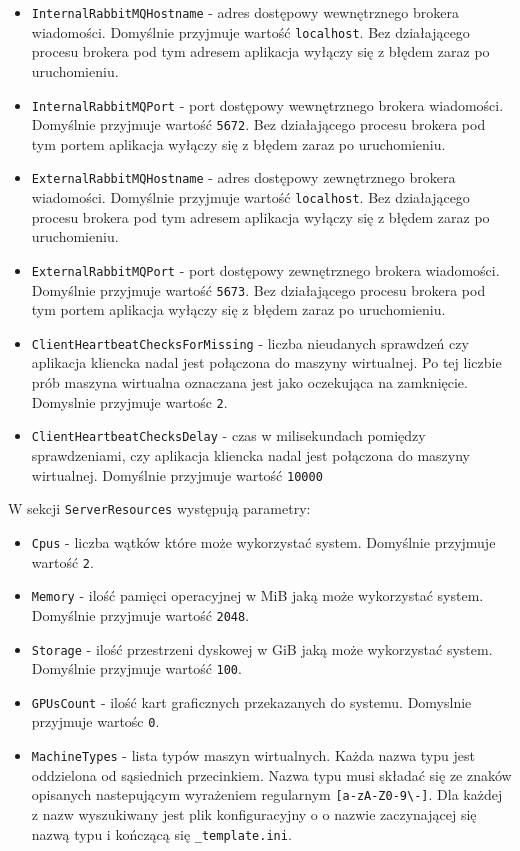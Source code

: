 \documentclass[../opis-rozwiazania.tex]{subfiles}
\begin{document}
\begin{itemize}
	\item \texttt{InternalRabbitMQHostname} - adres dostępowy wewnętrznego brokera wiadomości. Domyślnie przyjmuje wartość \texttt{localhost}. Bez działającego procesu brokera pod tym adresem aplikacja wyłączy się z błędem zaraz po uruchomieniu.
	\item \texttt{InternalRabbitMQPort} - port dostępowy wewnętrznego brokera wiadomości. Domyślnie przyjmuje wartość \texttt{5672}. Bez działającego procesu brokera pod tym portem aplikacja wyłączy się z błędem zaraz po uruchomieniu.
	\item \texttt{ExternalRabbitMQHostname} - adres dostępowy zewnętrznego brokera wiadomości. Domyślnie przyjmuje wartość \texttt{localhost}. Bez działającego procesu brokera pod tym adresem aplikacja wyłączy się z błędem zaraz po uruchomieniu.
	\item \texttt{ExternalRabbitMQPort} -  port dostępowy zewnętrznego brokera wiadomości. Domyślnie przyjmuje wartość \texttt{5673}. Bez działającego procesu brokera pod tym portem aplikacja wyłączy się z błędem zaraz po uruchomieniu.
	\item \texttt{ClientHeartbeatChecksForMissing} - liczba nieudanych sprawdzeń czy aplikacja kliencka nadal jest połączona do maszyny wirtualnej. Po tej liczbie prób maszyna wirtualna oznaczana jest jako oczekująca na zamknięcie. Domyslnie przyjmuje wartośc \texttt{2}.
	\item \texttt{ClientHeartbeatChecksDelay} - czas w milisekundach pomiędzy sprawdzeniami, czy aplikacja kliencka nadal jest połączona do maszyny wirtualnej. Domyślnie przyjmuje wartość \texttt{10000}
\end{itemize}

W sekcji \texttt{ServerResources} występują parametry:
\begin{itemize}
	\item \texttt{Cpus} - liczba wątków które może wykorzystać system. Domyślnie przyjmuje wartość \texttt{2}.
	\item \texttt{Memory} - ilość pamięci operacyjnej w MiB jaką może wykorzystać system. Domyślnie przyjmuje wartość \texttt{2048}.
	\item \texttt{Storage} - ilość przestrzeni dyskowej w GiB jaką może wykorzystać system. Domyślnie przyjmuje wartość \texttt{100}.
	\item \texttt{GPUsCount} - ilość kart graficznych przekazanych do systemu. Domyslnie przyjmuje wartośc \texttt{0}.
	\item \texttt{MachineTypes} - lista typów maszyn wirtualnych. Każda nazwa typu jest oddzielona od sąsiednich przecinkiem. Nazwa typu musi składać się ze znaków opisanych nastepującym wyrażeniem regularnym \texttt{[a-zA-Z0-9\textbackslash-]}. Dla każdej z nazw wyszukiwany jest plik konfiguracyjny o o nazwie zaczynającej się nazwą typu i kończącą się \texttt{\_template.ini}.
\end{itemize}
\end{document}
